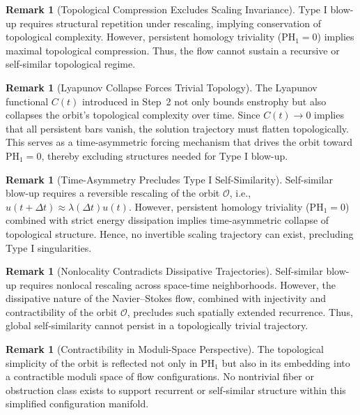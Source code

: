 \documentclass[11pt]{article}
\theoremstyle{definition}
\newtheorem{remark}[theorem]{Remark}
\begin{document}
\begin{remark}[Topological Compression Excludes Scaling Invariance]
Type I blow-up requires structural repetition under rescaling, implying conservation of topological complexity. However, persistent homology triviality ($\mathrm{PH}_1 = 0$) implies maximal topological compression. Thus, the flow cannot sustain a recursive or self-similar topological regime.
\end{remark}

\begin{remark}[Lyapunov Collapse Forces Trivial Topology]
The Lyapunov functional $C(t)$ introduced in Step~2 not only bounds enstrophy but also collapses the orbit’s topological complexity over time. Since $C(t) \to 0$ implies that all persistent bars vanish, the solution trajectory must flatten topologically. This serves as a time-asymmetric forcing mechanism that drives the orbit toward $\mathrm{PH}_1 = 0$, thereby excluding structures needed for Type I blow-up.
\end{remark}


\begin{remark}[Time-Asymmetry Precludes Type I Self-Similarity]
Self-similar blow-up requires a reversible rescaling of the orbit $\mathcal{O}$, i.e., $u(t+\Delta t) \approx \lambda(\Delta t) u(t)$. However, persistent homology triviality ($\mathrm{PH}_1 = 0$) combined with strict energy dissipation implies time-asymmetric collapse of topological structure. Hence, no invertible scaling trajectory can exist, precluding Type I singularities.
\end{remark}

\begin{remark}[Nonlocality Contradicts Dissipative Trajectories]
Self-similar blow-up requires nonlocal rescaling across space-time neighborhoods. However, the dissipative nature of the Navier--Stokes flow, combined with injectivity and contractibility of the orbit $\mathcal{O}$, precludes such spatially extended recurrence. Thus, global self-similarity cannot persist in a topologically trivial trajectory.
\end{remark}

\begin{remark}[Contractibility in Moduli-Space Perspective]
The topological simplicity of the orbit is reflected not only in $\mathrm{PH}_1$ but also in its embedding into a contractible moduli space of flow configurations. No nontrivial fiber or obstruction class exists to support recurrent or self-similar structure within this simplified configuration manifold.
\end{remark}
\end{document}
